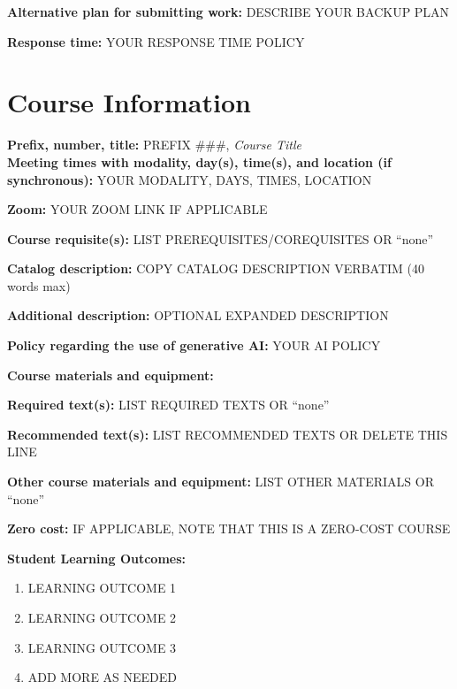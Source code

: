 \documentclass[12pt]{article}     %
\begin{document}
\vspace{0.5em}
\noindent \textbf{Alternative plan for submitting work:} DESCRIBE YOUR BACKUP PLAN

\vspace{0.5em}
\noindent \textbf{Response time:} YOUR RESPONSE TIME POLICY

\section*{Course Information}
\noindent \textbf{Prefix, number, title:} PREFIX \#\#\#, \textit{Course Title} \\
\noindent \textbf{Meeting times with modality, day(s), time(s), and location (if synchronous):} 
YOUR MODALITY, DAYS, TIMES, LOCATION

\vspace{0.5em}
\begin{flatlist}
\item \textbf{Zoom:} YOUR ZOOM LINK IF APPLICABLE
\item \textbf{Course requisite(s):} LIST PREREQUISITES/COREQUISITES OR ``none''
\item \textbf{Catalog description:} COPY CATALOG DESCRIPTION VERBATIM (40 words max)
\item \textbf{Additional description:} OPTIONAL EXPANDED DESCRIPTION
\item \textbf{Policy regarding the use of generative AI:} YOUR AI POLICY
\item \textbf{Course materials and equipment:} ~
\item \textbf{Required text(s):} LIST REQUIRED TEXTS OR ``none''
\item \textbf{Recommended text(s):} LIST RECOMMENDED TEXTS OR DELETE THIS LINE
\item \textbf{Other course materials and equipment:} LIST OTHER MATERIALS OR ``none''
\item \textbf{Zero cost:} IF APPLICABLE, NOTE THAT THIS IS A ZERO-COST COURSE
\end{flatlist}

\vspace{1em}
\noindent \textbf{Student Learning Outcomes:}
\begin{enumerate}
\item LEARNING OUTCOME 1
\item LEARNING OUTCOME 2
\item LEARNING OUTCOME 3
\item ADD MORE AS NEEDED
\end{enumerate}
\end{document}
